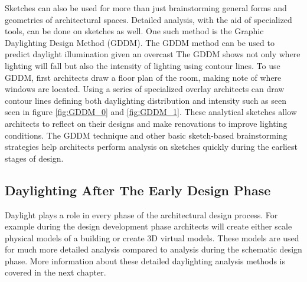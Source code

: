   Sketches can also be used for more than just brainstorming general forms and geometries of architectural spaces. 
  Detailed analysis, with the aid of specialized tools, can be done on sketches as well.
  One such method is the Graphic Daylighting Design Method (GDDM)\cite{millet1980graphic,moore}.
  The GDDM method can be used to predict daylight illumination given an overcast
  The GDDM shows not only where lighting will fall but also the intensity of lighting using contour lines.
  To use GDDM, first architects draw a floor plan of the room, making note of where windows are located.
  Using a series of specialized overlay architects can draw contour lines defining both daylighting distribution and intensity such as seen seen in figure \ref{fig:GDDM_0} and \ref{fig:GDDM_1}.
  These analytical sketches allow architects to reflect on their designs and make renovations to improve lighting conditions.
  The GDDM technique and other basic sketch-based brainstorming strategies help architects perform analysis on sketches quickly during the earliest stages of design.




  \subsection{Daylighting After The Early Design Phase}
  Daylight plays a role in every phase of the architectural design process.
  For example during the design development phase architects will create either scale physical models of a building or create 3D virtual models.
  These models are used for much more detailed analysis compared to analysis during the schematic design phase.
  More information about these detailed daylighting analysis methods is covered in the next chapter.



